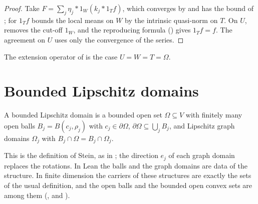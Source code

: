 \begin{proof}
\leanok
Take $F = \sum_j \eta_j * 1_W (k_j * 1_T f)$, which converges by 
and has the bound of ;  for $1_T f$
bounds the local means on $W$ by the intrinsic quasi-norm on $T$. On $U$,
removes the cut-off $1_W$, and the reproducing formula () gives
$1_T f = f$. The agreement on $U$ uses only the convergence of the series.
\end{proof}

The extension operator of  is the case $U = W = T = \Omega$.

\section{Bounded Lipschitz domains}
\label{sec:bounded-lipschitz-domains}

\begin{definition}
\label{def:bounded-lipschitz}
\leanok
{}
A bounded Lipschitz domain is a bounded open set $\Omega \subseteq V$ with finitely many open balls
$B_j = B(c_j, \rho_j)$ with $c_j \in \partial\Omega$, $\partial \Omega \subseteq \bigcup_j B_j$, and
Lipschitz graph domains $\Omega_j$ with $B_j \cap \Omega = B_j \cap \Omega_j$.
\end{definition}

This is the definition of Stein, as in \cite[Remark 3.2]{SchneiderVybiral}; the
direction $e_j$ of each graph domain replaces the rotations. In Lean the balls and the graph
domains are data of the structure. In finite dimension the carriers of these structures are
exactly the sets of the usual definition, and the open balls and the bounded open convex sets are
among them (,  and
).

